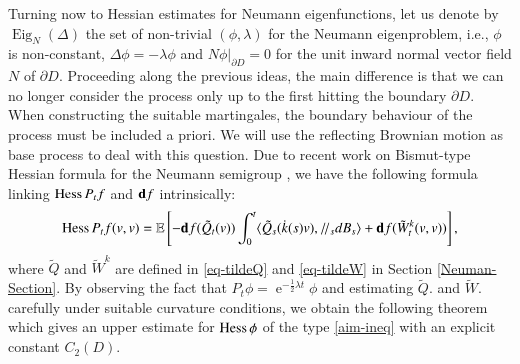 \documentclass[11pt,reqno]{amsart}
\theoremstyle{definition} \newtheorem{remark}[theorem]{Remark}
\numberwithin{equation}{section}
\newcommand\1{\mathbbm{1}}
\def\Eig{\operatorname{Eig}} \def\II{{\operatorname{II}}}
\def\bd{{\bf d}}
\def\r{\right}
\def\l{\left} \def\e{\operatorname{e}} \def\dsum{\displaystyle\sum}
\newcommand{\ptr}{/\!/}
\def\II{{\operatorname{II}}}
\begin{document}
Turning now to Hessian estimates for Neumann eigenfunctions, let us 
denote by $\Eig_N(\Delta)$ the set of non-trivial
$(\phi,\lambda)$ for the Neumann eigenproblem, i.e., $\phi$ is
non-constant, $\Delta \phi=-\lambda \phi$ and $N\phi|_{\partial D}=0$
for the unit inward normal vector field $N$ of $\partial D$. Proceeding along the 
previous ideas, the main difference is that we can no longer consider the process only 
up to the first hitting the boundary $\partial D$. When constructing the suitable
martingales, the boundary behaviour of the process must be included a priori.
We will use the reflecting Brownian motion as base process to
 deal with this question.  Due to recent work on Bismut-type Hessian formula for the Neumann
 semigroup \cite{CT22}, we have  the following formula linking $\operatorname{Hess} P_tf$ and $\bd f$ intrinsically:
  \begin{equation*}
    \Hess {P_tf}(v,v)=\E\l[-\bd f(\tilde{Q}_t(v))\int_0^t\langle \tilde{Q}_s(\dot{k}(s)v),
    \ptr_s d  B_s\rangle+ \bd f( \tilde{W}_t^k(v,v))\r],
  \end{equation*}
where $\tilde{Q}$ and $\tilde{W}^k$ are defined in \eqref{eq-tildeQ} and \eqref{eq-tildeW} in Section 
\ref{Neuman-Section}. 
By observing the fact that $P_t\phi=\e^{-\frac{1}{2}\lambda t}\phi$ and estimating $\tilde{Q}{\boldsymbol{.}}$ and $\tilde{W}{\!\boldsymbol{.}}$ carefully under suitable curvature conditions, we obtain the following
theorem which gives an upper estimate for $\operatorname{Hess}\phi$ of the type \eqref{aim-ineq}
with an explicit constant $C_2(D)$.
\end{document}
